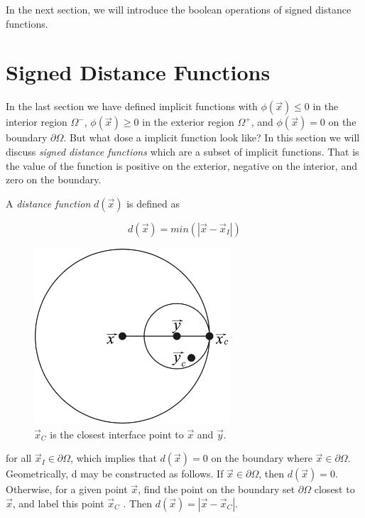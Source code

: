 In the next section, we will introduce the boolean operations of signed distance functions. 




\section{Signed Distance Functions}
In the last section we have defined implicit functions with $\phi(\vec{x})\leq 0$ in the interior region $\Omega^-$, $\phi(\vec{x})\geq 0$ in the exterior region $\Omega^+$, and $\phi(\vec{x})=0$ on the boundary $\partial\Omega$. But what dose a implicit function look like? In this section we will discuss \textit{signed distance functions} which are a subset of implicit functions. That is the value of the function is positive on the exterior, negative on the interior, and zero on the boundary. 

A \textit{distance function} $d(\vec{x})$ is defined as 

\begin{equation}
	d(\vec{x})=min(|\vec{x}-\vec{x}_{I}|)  
\end{equation}

\begin{figure}
\sidecaption
	\includegraphics[width=0.65\textwidth]{graphics/df/distance-function}
	\caption{$\vec{x}_C$ is the closest interface point to $\vec{{x}}$ and $\vec{y}$.}
\end{figure}

for all $\vec{x}_{I}\in\partial\Omega$, which implies that $d(\vec{x})=0$ on the boundary where $\vec{x}\in\partial\Omega$. Geometrically, d may be constructed as follows. If $\vec{x}\in\partial\Omega$, then $d(\vec{x}) = 0$. Otherwise, for a given point $\vec{x}$, find the point on the boundary set $\partial\Omega$ closest to $\vec{x}$, and label this point $\vec{x}_C$ . Then $d(\vec{x}) = |\vec{x} - \vec{x}_C |$.

